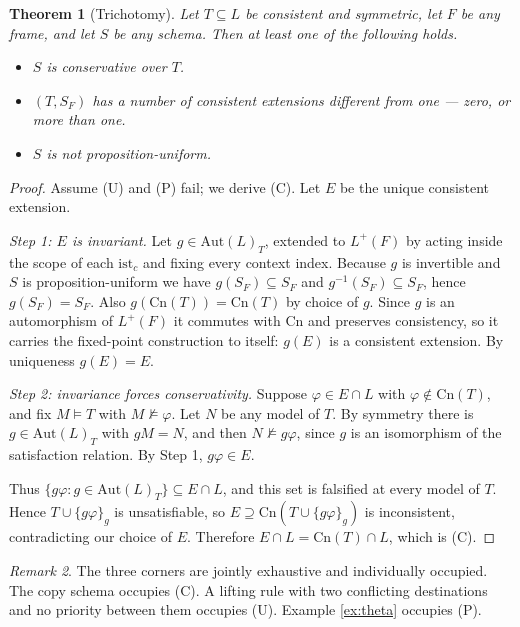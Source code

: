 \documentclass[11pt]{article}
\theoremstyle{plain}
\newtheorem{theorem}{Theorem}
\theoremstyle{definition}
\theoremstyle{remark}
\newtheorem{remark}[theorem]{Remark}
\newcommand{\ist}{\mathrm{ist}}
\newcommand{\Cn}{\mathrm{Cn}}
\newcommand{\Aut}{\mathrm{Aut}}
\newcommand{\Lp}{L^{+}}
\begin{document}
\begin{theorem}[Trichotomy]\label{thm:trichotomy}
Let $T \subseteq L$ be consistent and symmetric, let $F$ be any frame, and let
$S$ be any schema. Then at least one of the following holds.
\begin{itemize}
\item[\textup{(C)}] $S$ is conservative over $T$.
\item[\textup{(U)}] $(T,S_F)$ has a number of consistent extensions different
from one --- zero, or more than one.
\item[\textup{(P)}] $S$ is not proposition-uniform.
\end{itemize}
\end{theorem}

\begin{proof}
Assume (U) and (P) fail; we derive (C). Let $E$ be the unique consistent
extension.

\emph{Step 1: $E$ is invariant.}
Let $g \in \Aut(L)_T$, extended to $\Lp(F)$ by acting inside the scope of each
$\ist_c$ and fixing every context index. Because $g$ is invertible and $S$ is
proposition-uniform we have $g(S_F) \subseteq S_F$ and
$g^{-1}(S_F)\subseteq S_F$, hence $g(S_F)=S_F$. Also $g(\Cn(T))=\Cn(T)$ by
choice of $g$. Since $g$ is an automorphism of $\Lp(F)$ it commutes with $\Cn$
and preserves consistency, so it carries the fixed-point construction to itself:
$g(E)$ is a consistent extension. By uniqueness $g(E)=E$.

\emph{Step 2: invariance forces conservativity.}
Suppose $\varphi \in E \cap L$ with $\varphi \notin \Cn(T)$, and fix
$M \models T$ with $M \not\models \varphi$. Let $N$ be any model of $T$. By
symmetry there is $g \in \Aut(L)_T$ with $gM = N$, and then
$N \not\models g\varphi$, since $g$ is an isomorphism of the satisfaction
relation. By Step 1, $g\varphi \in E$.

Thus $\{g\varphi : g \in \Aut(L)_T\} \subseteq E \cap L$, and this set is
falsified at every model of $T$. Hence $T \cup \{g\varphi\}_g$ is unsatisfiable,
so $E \supseteq \Cn(T \cup \{g\varphi\}_g)$ is inconsistent, contradicting our
choice of $E$. Therefore $E \cap L = \Cn(T)\cap L$, which is (C).
\end{proof}

\begin{remark}
The three corners are jointly exhaustive and individually occupied. The copy
schema occupies (C). A lifting rule with two conflicting destinations and no
priority between them occupies (U). Example \ref{ex:theta} occupies (P).
\end{remark}
\end{document}
